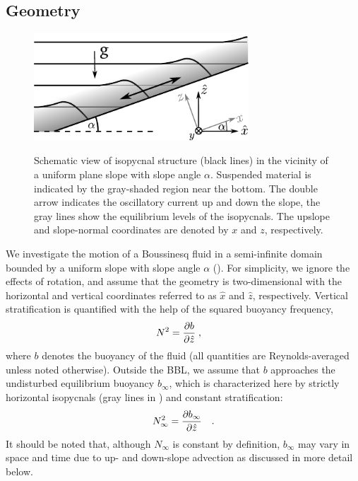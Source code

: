 \subsection{Geometry}
\begin{figure}[h]
  \noindent\includegraphics[width=19pc,angle=0]{bilder/geometry.pdf}\\
  \caption{Schematic view of isopycnal structure (black lines) in
    the vicinity of a uniform plane slope with slope angle
    $\alpha$. Suspended material is indicated by the gray-shaded
    region near the bottom. The double arrow indicates the oscillatory
    current up and down the slope, the gray lines show the equilibrium
    levels of the isopycnals. The upslope and slope-normal coordinates
    are denoted by $x$ and $z$, respectively.}\label{slopesketch}
\end{figure}
We investigate the motion of a Boussinesq fluid in a semi-infinite
domain bounded by a uniform slope with slope angle $\alpha$
(). For simplicity, we ignore the effects of rotation, and
assume that the geometry is two-dimensional with the horizontal and
vertical coordinates referred to as $\hat{x}$ and $\hat{z}$,
respectively. Vertical stratification is quantified with the help of the
squared buoyancy frequency,
\begin{equation}
  \label{NN}
  N^2 = \dfrac{\partial {b}}{\partial {\hat{z}}} \; , \quad
\end{equation}
where $b$ denotes the buoyancy of the fluid (all quantities are
Reynolds-averaged unless noted otherwise). Outside the BBL, we assume
that $b$ approaches the undisturbed equilibrium buoyancy $b_\infty$,
which is characterized here by strictly horizontal isopycnals (gray
lines in ) and constant stratification:
\begin{equation}
  \label{NNinf}
  N^2_\infty = \dfrac{\partial {b_\infty}}{\partial {\hat{z}}} \quad .
\end{equation}
It should be noted that, although $N_\infty$ is constant by
definition, $b_\infty$ may vary in space and time due to up- and
down-slope advection as discussed in more detail below.

